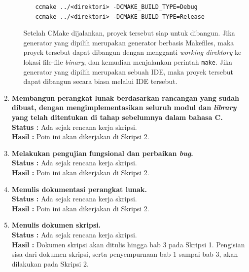 \documentclass[a4paper,twoside]{article}
\begin{document}
\begin{enumerate}
\begin{enumerate}
\begin{itemize}
		\begin{lstlisting}[caption=Kode utama operasional CMakeLists, label=code:cmake-multibuild]
ccmake ../<direktori> -DCMAKE_BUILD_TYPE=Debug
ccmake ../<direktori> -DCMAKE_BUILD_TYPE=Release
		\end{lstlisting}
		
	\end{itemize}
	
	Setelah CMake dijalankan, proyek tersebut siap untuk dibangun. Jika generator yang dipilih \linebreak merupakan generator berbasis Makefiles, maka proyek tersebut dapat dibangun dengan \linebreak mengganti \textit{working direktory} ke lokasi file-file \textit{binary}, dan kemudian menjalankan perintah \verb|make|. Jika generator yang dipilih merupakan sebuah IDE, maka proyek tersebut dapat dibangun secara biasa melalui IDE tersebut.
\end{enumerate}
		
		\item \textbf{Membangun perangkat lunak berdasarkan rancangan yang sudah dibuat, dengan \linebreak mengimplementasikan seluruh modul dan \textit{library} yang telah ditentukan di tahap sebelumnya dalam bahasa C.}\\
		{\bf Status :} Ada sejak rencana kerja skripsi.\\
		{\bf Hasil :} Poin ini akan dikerjakan di Skripsi 2.

		\item \textbf{Melakukan pengujian fungsional dan perbaikan \textit{bug}.}\\
		{\bf Status :} Ada sejak rencana kerja skripsi.\\
		{\bf Hasil :} Poin ini akan dikerjakan di Skripsi 2.
		

		\item \textbf{Menulis dokumentasi perangkat lunak.}\\
		{\bf Status :} Ada sejak rencana kerja skripsi.\\
		{\bf Hasil :} Poin ini akan dikerjakan di Skripsi 2.

		\item \textbf{Menulis dokumen skripsi.}\\
		{\bf Status :} Ada sejak rencana kerja skripsi.\\
		{\bf Hasil :} Dokumen skripsi akan ditulis hingga bab 3 pada Skripsi 1. Pengisian sisa dari dokumen skripsi, serta penyempurnaan bab 1 sampai bab 3, akan dilakukan pada Skripsi 2.

	\end{enumerate}
\end{document}
